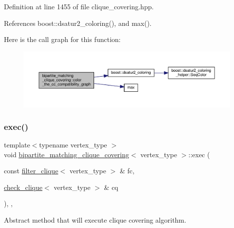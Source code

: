 Definition at line 1455 of file clique\+\_\+covering.\+hpp.



References boost\+::dsatur2\+\_\+coloring(), and max().

Here is the call graph for this function\+:
\nopagebreak
\begin{figure}[H]
\begin{center}
\leavevmode
\includegraphics[width=350pt]{d1/df2/classbipartite__matching__clique__covering_a371f3b2af258c516cb7c2c41b1a93a44_cgraph}
\end{center}
\end{figure}
\mbox{\label{classbipartite__matching__clique__covering_aa4caf6d3d3f37c7157f80c2e4d145a4e}} 
\subsubsection{\texorpdfstring{exec()}{exec()}}
{\footnotesize\ttfamily template$<$typename vertex\+\_\+type $>$ \\
void \hyperlink{classbipartite__matching__clique__covering}{bipartite\+\_\+matching\+\_\+clique\+\_\+covering}$<$ vertex\+\_\+type $>$\+::exec (\begin{DoxyParamCaption}\item[{const \hyperlink{structfilter__clique}{filter\+\_\+clique}$<$ vertex\+\_\+type $>$ \&}]{fc,  }\item[{\hyperlink{structcheck__clique}{check\+\_\+clique}$<$ vertex\+\_\+type $>$ \&}]{cq }\end{DoxyParamCaption})\hspace{0.3cm}{\ttfamily [inline]}, {\ttfamily [override]}, {\ttfamily [virtual]}}



Abstract method that will execute clique covering algorithm. 

